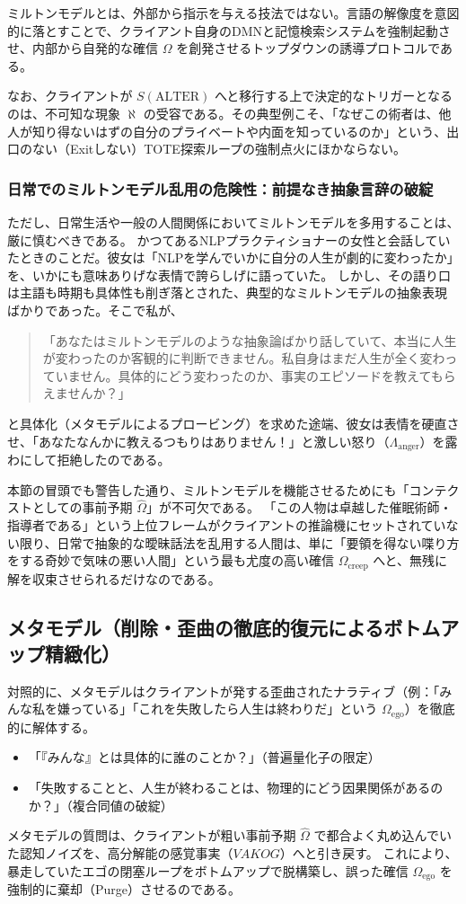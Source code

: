 ミルトンモデルとは、外部から指示を与える技法ではない。言語の解像度を意図的に落とすことで、クライアント自身のDMNと記憶検索システムを強制起動させ、内部から自発的な確信 $\Omega$ を創発させるトップダウンの誘導プロトコルである。

なお、クライアントが $S(\mathrm{ALTER})$ へと移行する上で決定的なトリガーとなるのは、不可知な現象 $\aleph$ の受容である。その典型例こそ、「なぜこの術者は、他人が知り得ないはずの自分のプライベートや内面を知っているのか」という、出口のない（Exitしない）TOTE探索ループの強制点火にほかならない。

\subsubsection{日常でのミルトンモデル乱用の危険性：前提なき抽象言辞の破綻}
ただし、日常生活や一般の人間関係においてミルトンモデルを多用することは、厳に慎むべきである。
かつてあるNLPプラクティショナーの女性と会話していたときのことだ。彼女は「NLPを学んでいかに自分の人生が劇的に変わったか」を、いかにも意味ありげな表情で誇らしげに語っていた。
しかし、その語り口は主語も時期も具体性も削ぎ落とされた、典型的なミルトンモデルの抽象表現ばかりであった。そこで私が、
\begin{quote}
「あなたはミルトンモデルのような抽象論ばかり話していて、本当に人生が変わったのか客観的に判断できません。私自身はまだ人生が全く変わっていません。具体的にどう変わったのか、事実のエピソードを教えてもらえませんか？」
\end{quote}
と具体化（メタモデルによるプロービング）を求めた途端、彼女は表情を硬直させ、「あなたなんかに教えるつもりはありません！」と激しい怒り（$\Lambda_{\mathrm{anger}}$）を露わにして拒絶したのである。

本節の冒頭でも警告した通り、ミルトンモデルを機能させるためにも「コンテクストとしての事前予期 $\hat{\Omega}$」が不可欠である。
「この人物は卓越した催眠術師・指導者である」という上位フレームがクライアントの推論機にセットされていない限り、日常で抽象的な曖昧話法を乱用する人間は、単に「要領を得ない喋り方をする奇妙で気味の悪い人間」という最も尤度の高い確信 $\Omega_{\mathrm{creep}}$ へと、無残に解を収束させられるだけなのである。

\subsection{メタモデル（削除・歪曲の徹底的復元によるボトムアップ精緻化）}
対照的に、メタモデルはクライアントが発する歪曲されたナラティブ（例：「みんな私を嫌っている」「これを失敗したら人生は終わりだ」という $\Omega_{\mathrm{ego}}$）を徹底的に解体する。
\begin{itemize}
    \item 「『みんな』とは具体的に誰のことか？」（普遍量化子の限定）
    \item 「失敗することと、人生が終わることは、物理的にどう因果関係があるのか？」（複合同値の破綻）
\end{itemize}
メタモデルの質問は、クライアントが粗い事前予期 $\hat{\Omega}$ で都合よく丸め込んでいた認知ノイズを、高分解能の感覚事実（$VAKOG$）へと引き戻す。
これにより、暴走していたエゴの閉塞ループをボトムアップで脱構築し、誤った確信 $\Omega_{\mathrm{ego}}$ を強制的に棄却（Purge）させるのである。

